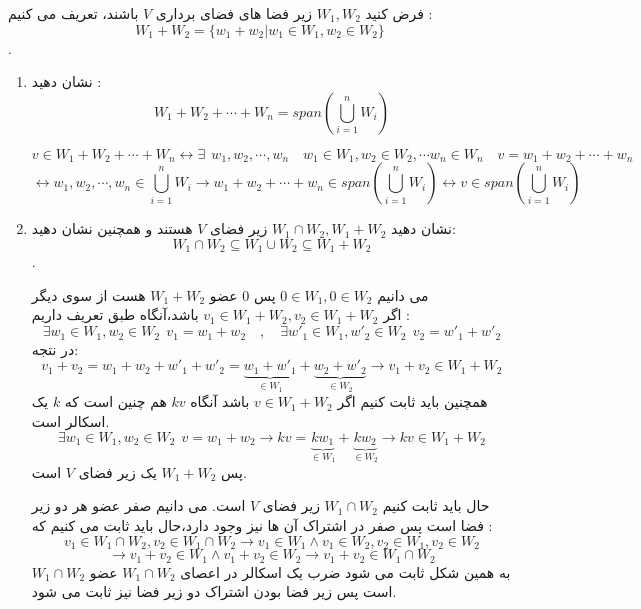 \documentclass{article}
\begin{document}
فرض کنید 
$W_1,W_2$
زیر فضا های فضای برداری 
$V$
باشند، تعریف می کنیم :
$$W_1+W_2=\{w_1+w_2|w_1\in W_1,w_2\in W_2\}$$.

\begin{enumerate}
	\item 
	نشان دهید :
	$$W_1+W_2+\cdots+W_n=span(\bigcup_{i=1}^{n}W_i)$$
	\begin{حل}
	$$v\in W_1+W_2+\cdots+W_n\longleftrightarrow \exists \ \ w_1,w_2,\cdots,w_n \quad w_1\in  W_1,w_2\in  W_2,\cdots w_n\in W_n \quad v=w_1+w_2+\cdots+w_n$$
	$$\longleftrightarrow w_1,w_2,\cdots,w_n\in\bigcup_{i=1}^{n}W_i\longrightarrow w_1+w_2+\cdots+w_n\in span(\bigcup_{i=1}^{n}W_i)\longleftrightarrow v\in span(\bigcup_{i=1}^{n}W_i) $$	
	\end{حل}
	\item 
	نشان دهید 
	$W_1\cap W_2,W_1+W_2$
	زیر فضای 
	$V$
	هستند و همچنین نشان دهید:
	$$W_1\cap W_2 \subseteq W_1\cup W_2\subseteq W_1+W_2$$.
	\begin{حل}
		می دانیم 
		$0\in W_1,0\in W_2$
		پس 0 عضو 
		$W_1+W_2$
		هست از سوی دیگر 
		\\
		اگر 
		$v_1\in W_1+W_2,v_2\in W_1+W_2$
		باشد،آنگاه طبق تعریف داریم :
		$$\exists w_1\in W_1,w_2\in W_2 \ \ v_1=w_1+w_2\quad,\quad \exists w'_1\in W_1,w'_2\in W_2 \ \ v_2=w'_1+w'_2$$
		در نتجه:
		$$v_1+v_2=w_1+w_2+w'_1+w'_2=\underbrace{w_1+w'_1}_{\in W_1}+\underbrace{w_2+w'_2}_{\in W_2}\longrightarrow v_1+v_2\in W_1+W_2$$
		همچنین باید ثابت کنیم اگر 
		$v\in W_1+W_2$
		باشد آنگاه 
		$kv$
		هم چنین است که 
		$k$
		یک اسکالر است.
		$$\exists w_1\in W_1,w_2\in W_2 \ \ v=w_1+w_2\longrightarrow kv=\underbrace{kw_1}_{\in W_1}+\underbrace{kw_2}_{\in W_2}\longrightarrow kv\in W_1+W_2$$
		پس 
		$W_1+W_2$
		یک زیر فضای 
		$V$
		است.
		
		حال باید ثابت کنیم 
		$W_1\cap W_2 $
		زیر فضای 
		$V$
		است. می دانیم صفر عضو هر دو زیر فضا است پس صفر در اشتراک آن ها نیز وجود دارد،حال باید ثابت می کنیم که :
		$$v_1\in W_1\cap W_2, v_2\in W_1\cap W_2\longrightarrow v_1\in W_1\wedge v_1\in W_2, v_2\in W_1,v_2\in W_2$$$$\longrightarrow v_1+v_2\in W_1\wedge v_1+v_2\in W_2\longrightarrow v_1+v_2\in W_1\cap W_2 $$
		به همین شکل ثابت می شود ضرب یک اسکالر در اعصای 
		$W_1\cap W_2$
		عضو 
		$W_1\cap W_2$
		است پس زیر فضا بودن اشتراک دو زیر فضا نیز ثابت می شود.
		

\end{حل}
\end{enumerate}
\end{document}
